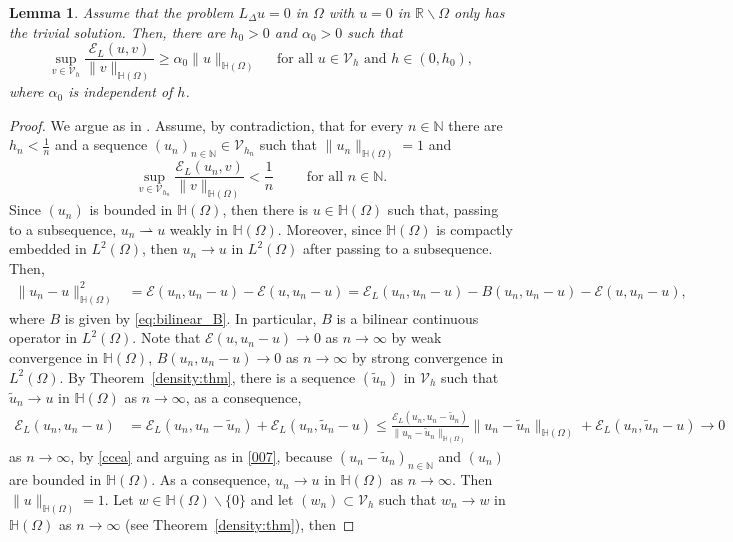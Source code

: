 \documentclass[11 pt]{article}
\newtheorem{lemma}[theorem]{Lemma}
\numberwithin{equation}{section}
\def\N{\mathbb{N}}
\def\R{\mathbb{R}}
\def\cE{\mathcal{E}}
\begin{document}
\begin{lemma}
Assume that the problem $L_\Delta u=0$ in $\Omega$ with $u=0$ in $\R\backslash  \Omega$ only has the trivial solution.  Then, there are $h_0>0$ and $\alpha_0>0$ such that
\begin{equation*}
    \sup_{v\in \mathcal V_h}\frac{\cE_{L}(u,v)}{\|v\|_{\mathbb H(\Omega)}}\geq \alpha_0\|u\|_{\mathbb H(\Omega)} \quad\text{ for all } u\in\mathcal V_h \text{ and }h\in(0,h_0),
\end{equation*}
where $\alpha_0$ is independent of $h$.
\end{lemma}
\begin{proof}
We argue as in \cite[Theorem 4.2.1]{dem20}. Assume, by contradiction, that for every $n\in\N$ there are $h_n<\frac{1}{n}$ and a sequence $(u_n)_{n\in\N}\in \mathcal V_{h_n}$ such that $\|u_n\|_{\mathbb H(\Omega)}=1$ and
\begin{equation}\label{ccea}
    \sup_{v\in \mathcal V_{h_n}}\frac{\cE_{L}(u_n,v)}{\|v\|_{\mathbb H(\Omega)}}<\frac{1}{n}\qquad \text{ for all }n\in\N.
\end{equation}
Since $(u_n)$ is bounded in $\mathbb H(\Omega)$, then there is $u\in \mathbb H(\Omega)$ such that, passing to a subsequence, $u_n \rightharpoonup u$ weakly in $\mathbb H(\Omega)$. Moreover, since $\mathbb H(\Omega)$ is compactly embedded in $L^2(\Omega)$, then $u_n\to u$ in $L^2(\Omega)$ after passing to a subsequence.  Then,
\begin{align}
    \|u_n-u\|^2_{\mathbb H(\Omega)}
    &=\cE(u_n,u_n-u)-\cE(u,u_n-u)=\cE_L(u_n,u_n-u)-B(u_n,u_n-u)-\cE(u,u_n-u),\label{007}
\end{align}
where $B$ is given by \eqref{eq:bilinear_B}.  In particular, $B$ is a bilinear continuous operator in $L^2(\Omega)$.  Note that $\cE(u,u_n-u)\to 0$ as $n\to \infty$ by weak convergence in $\mathbb H(\Omega)$, $B(u_n,u_n-u)\to 0$ as $n\to \infty$ by strong convergence in $L^2(\Omega)$. By Theorem~\ref{density:thm}, there is a sequence $(\widetilde u_n)$ in $\mathcal V_h$ such that $\widetilde u_n\to u$ in $\mathbb H(\Omega)$ as $n\to \infty$, as a consequence,
\begin{align*}
    \cE_L(u_n,u_n-u)
    &=\cE_L(u_n,u_n-\widetilde u_n)+\cE_L(u_n,\widetilde u_n-u)
    \leq \frac{\cE_L(u_n,u_n-\widetilde u_n)}{\|u_n-\widetilde u_n\|_{\mathbb H(\Omega)}}\|u_n-\widetilde u_n\|_{\mathbb H(\Omega)}+\cE_L(u_n,\widetilde u_n-u) \to 0
\end{align*}
as $n\to \infty$, by \eqref{ccea} and arguing as in \eqref{007}, because $(u_n-\widetilde u_n)_{n\in\N}$ and $(u_n)$ are bounded in $\mathbb H(\Omega)$.  As a consequence, $u_n\to u$ in $\mathbb H(\Omega)$ as $n\to\infty$. Then $\|u\|_{\mathbb H(\Omega)}=1$. Let $w\in \mathbb H(\Omega)\backslash \{0\}$ and let $(w_n)\subset \mathcal V_h$ such that $w_n\to w$ in $\mathbb H(\Omega)$ as $n\to \infty$ (see Theorem~\ref{density:thm}), then

\end{proof}
\end{document}
